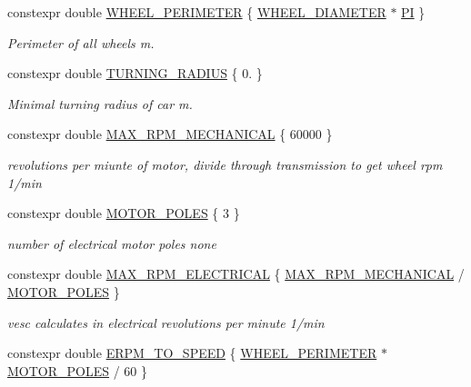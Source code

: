 \begin{DoxyCompactItemize}
constexpr double \hyperlink{namespacecar__config_a46fe00906da07d2e030b586a634cd907}{W\+H\+E\+E\+L\+\_\+\+P\+E\+R\+I\+M\+E\+T\+ER} \{ \hyperlink{namespacecar__config_a6f064e331d6d85d46028dfbe75f063dd}{W\+H\+E\+E\+L\+\_\+\+D\+I\+A\+M\+E\+T\+ER} $\ast$ \hyperlink{namespacecar__config_a90cb9957197db8924811c447bc98703a}{PI} \}
\begin{DoxyCompactList}\small\item\em Perimeter of all wheels  m. \end{DoxyCompactList}\item 
constexpr double \hyperlink{namespacecar__config_afe308ba7ae07f7bd5af7e79a095101a9}{T\+U\+R\+N\+I\+N\+G\+\_\+\+R\+A\+D\+I\+US} \{ 0. \}
\begin{DoxyCompactList}\small\item\em Minimal turning radius of car  m. \end{DoxyCompactList}\item 
constexpr double \hyperlink{namespacecar__config_ad35069a183782259c6280aa219b72ffa}{M\+A\+X\+\_\+\+R\+P\+M\+\_\+\+M\+E\+C\+H\+A\+N\+I\+C\+AL} \{ 60000 \}
\begin{DoxyCompactList}\small\item\em revolutions per miunte of motor, divide through transmission to get wheel rpm  1/min \end{DoxyCompactList}\item 
constexpr double \hyperlink{namespacecar__config_a611a0f02cf52db1d438a2dd53b642cd5}{M\+O\+T\+O\+R\+\_\+\+P\+O\+L\+ES} \{ 3 \}
\begin{DoxyCompactList}\small\item\em number of electrical motor poles  none \end{DoxyCompactList}\item 
constexpr double \hyperlink{namespacecar__config_aaf4d6a90e2b9c983b0b0d29a584c399b}{M\+A\+X\+\_\+\+R\+P\+M\+\_\+\+E\+L\+E\+C\+T\+R\+I\+C\+AL} \{ \hyperlink{namespacecar__config_ad35069a183782259c6280aa219b72ffa}{M\+A\+X\+\_\+\+R\+P\+M\+\_\+\+M\+E\+C\+H\+A\+N\+I\+C\+AL} / \hyperlink{namespacecar__config_a611a0f02cf52db1d438a2dd53b642cd5}{M\+O\+T\+O\+R\+\_\+\+P\+O\+L\+ES} \}
\begin{DoxyCompactList}\small\item\em vesc calculates in electrical revolutions per minute  1/min \end{DoxyCompactList}\item 
constexpr double \hyperlink{namespacecar__config_af33b95798967e7193927782fd91d36ce}{E\+R\+P\+M\+\_\+\+T\+O\+\_\+\+S\+P\+E\+ED} \{ \hyperlink{namespacecar__config_a46fe00906da07d2e030b586a634cd907}{W\+H\+E\+E\+L\+\_\+\+P\+E\+R\+I\+M\+E\+T\+ER} $\ast$ \hyperlink{namespacecar__config_a611a0f02cf52db1d438a2dd53b642cd5}{M\+O\+T\+O\+R\+\_\+\+P\+O\+L\+ES} / 60 \}

\end{DoxyCompactItemize}
